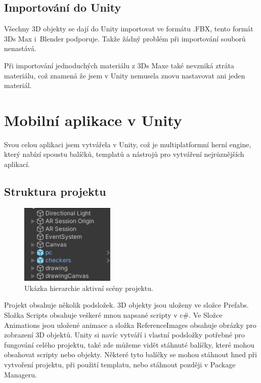 \documentclass[12pt, a4paper,
twoside,        %
openright
]{report}
\let\oldchapter\chapter
\renewcommand{\chapter}{
	\clearpage
	\pagestyle{fancy}
	\oldchapter
}
\begin{document}
\section {Importování do Unity}
\label{import_do_unity}
Všechny 3D objekty se dají do Unity importovat ve formátu .FBX, tento formát 3Ds Max i~Blender podporuje. Takže žádný problém při importování souborů nenastává.

Při importování jednoduchých materiálu z 3Ds Maxe také nevzniká ztráta materiálu, což znamená že jsem v Unity nemusela znovu nastavovat ani jeden materiál. 






\chapter{Mobilní aplikace v Unity}	

Svou celou aplikaci jsem vytvářela v Unity, což je multiplatformní herní engine, který nabízí spoustu balíčků, templatů a nástrojů pro vytváření nejrůznějších aplikací.  

	\section{Struktura projektu}
\label{sec:struktura_projektu}

		\begin{figure}[h!]
	\centering 
	\includegraphics[width=0.4\textwidth]{image/hierarchy.jpg} 
	\caption{Ukázka hierarchie aktivní scény projektu.} 
	\label{fig:hierarchie} 
\end{figure}


	Projekt obsahuje několik podsložek. 
	3D objekty jsou uloženy ve složce Prefabs. Složka Scripts obsahuje veškeré mnou napsané scripty v c\#. Ve Složce Animations jsou uložené animace a složka ReferenceImages obsahuje obrázky pro zobrazení 3D objektů. Unity si navíc vytváří i vlastní podsložky potřebné pro fungování celého projektu, také zde můžeme vidět stáhnuté balíčky, které mohou obsahovat scripty nebo objekty. Některé tyto balíčky se mohou stáhnout hned při vytvoření projektu, při použití templatu, nebo stáhnout později v Package Manageru.
	
\end{document}
